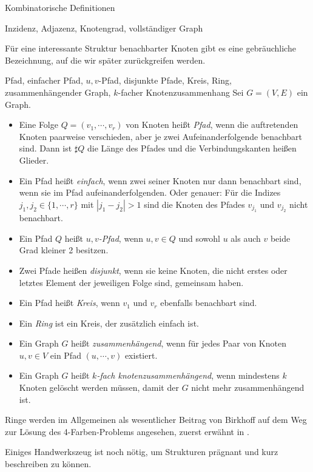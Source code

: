 \begin{section}{Kombinatorische Definitionen}
\begin{definition}{Inzidenz, Adjazenz, Knotengrad, vollständiger Graph}
\begin{itemize}
   \end{itemize}
  \end{definition}
    
  Für eine interessante Struktur benachbarter Knoten gibt es eine gebräuchliche Bezeichnung, auf die wir später zurückgreifen werden.
  
  \begin{definition}{Pfad, einfacher Pfad, $u,v$-Pfad, disjunkte Pfade, Kreis, Ring, zusammenhängender Graph, $k$-facher Knotenzusammenhang}
  Sei $G=(V,E)$ ein Graph.
   \begin{itemize}
    \item Eine Folge $Q = (v_1,\cdots,v_r)$ von Knoten heißt \textit{Pfad}, wenn die auftretenden Knoten paarweise verschieden, aber je zwei Aufeinanderfolgende benachbart sind. Dann ist $\sharp Q$ die Länge des Pfades und die Verbindungskanten heißen Glieder.
    \item Ein Pfad heißt \textit{einfach}, wenn zwei seiner Knoten nur dann benachbart sind, wenn sie im Pfad aufeinanderfolgenden. Oder genauer: Für die Indizes $j_1, j_2 \in \{1,\cdots,r\}$ mit $|j_1 - j_2| > 1$ sind die Knoten des Pfades $v_{j_1}$ und $v_{j_2}$ nicht benachbart.
    \item Ein Pfad $Q$ heißt \textit{$u,v$-Pfad}, wenn $u,v \in Q$ und sowohl $u$ als auch $v$ beide Grad kleiner 2 besitzen.
    \item Zwei Pfade heißen \textit{disjunkt}, wenn sie keine Knoten, die nicht erstes oder letztes Element der jeweiligen Folge sind, gemeinsam haben. 
    \item Ein Pfad heißt \textit{Kreis}, wenn $v_1$ und $v_r$ ebenfalls benachbart sind.
    \item Ein \textit{Ring} ist ein Kreis, der zusätzlich einfach ist.
    \item Ein Graph $G$ heißt \textit{zusammenhängend}, wenn für jedes Paar von Knoten $u,v \in V$ ein Pfad $(u,\cdots,v)$ existiert.
    \item Ein Graph $G$ heißt \textit{$k$-fach knotenzusammenhängend}, wenn mindestens $k$ Knoten gelöscht werden müssen, damit der $G$ nicht mehr zusammenhängend ist.
   \end{itemize}
  \end{definition}
  
  Ringe werden im Allgemeinen als wesentlicher Beitrag von Birkhoff auf dem Weg zur Lösung des 4-Farben-Problems angesehen, zuerst erwähnt in \cite{AmJMath35}.

  Einiges Handwerkszeug ist noch nötig, um Strukturen prägnant und kurz beschreiben zu können.
  

\end{section}
